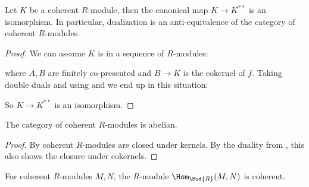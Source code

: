 \begin{theorem}
  \label{coherent-self-dual}
  Let $K$ be a coherent $R$-module, then the canonical map $K\to K^{\ast\ast}$ is an isomorphism.
  In particular, dualization is an anti-equivalence of the category of coherent $R$-modules.
\end{theorem}

\begin{proof}
  We can assume $K$ is in a sequence of $R$-modules:
  \begin{center}
  \end{center}
  where $A,B$ are finitely co-presented and $B\to K$ is the cokernel of $f$.
  Taking double duals and using  and  we end up in this situation:
  \begin{center}
  \end{center}
  So $K\to K^{\ast\ast}$ is an isomorphism.
\end{proof}

\begin{theorem}
  \label{coherent-R-modules-abelian}
   The category of coherent $R$-modules is abelian.
\end{theorem}

\begin{proof}
  By  coherent $R$-modules are closed under kernels.
  By the duality from , this also shows the closure under cokernels.
\end{proof}

\begin{remark}
  \label{hom-closure}
  For coherent $R$-modules $M,N$, the $R$-module $\Hom_{\Mod{R}}(M,N)$ is coherent.
\end{remark}

